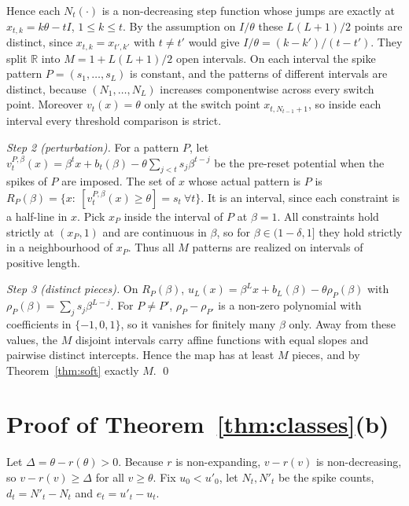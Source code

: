 \documentclass[10pt]{article}
\theoremstyle{remark}
\begin{document}
Hence each $N_t(\cdot)$ is a non-decreasing step function whose jumps are exactly at $x_{t,k}=k\theta-tI$, $1\le k\le t$. By the assumption on $I/\theta$ these $L(L+1)/2$ points are distinct, since $x_{t,k}=x_{t',k'}$ with $t\ne t'$ would give $I/\theta=(k-k')/(t-t')$. They split $\mathbb R$ into $M=1+L(L+1)/2$ open intervals. On each interval the spike pattern $P=(s_1,\ldots,s_L)$ is constant, and the patterns of different intervals are distinct, because $(N_1,\ldots,N_L)$ increases componentwise across every switch point. Moreover $v_t(x)=\theta$ only at the switch point $x_{t,N_{t-1}+1}$, so inside each interval every threshold comparison is strict.

\emph{Step 2 (perturbation).} For a pattern $P$, let $v^{P,\beta}_t(x)=\beta^tx+b_t(\beta)-\theta\sum_{j<t}s_j\beta^{t-j}$ be the pre-reset potential when the spikes of $P$ are imposed. The set of $x$ whose actual pattern is $P$ is $R_P(\beta)=\{x:\ [v^{P,\beta}_t(x)\ge\theta]=s_t\ \forall t\}$. It is an interval, since each constraint is a half-line in $x$. Pick $x_P$ inside the interval of $P$ at $\beta=1$. All constraints hold strictly at $(x_P,1)$ and are continuous in $\beta$, so for $\beta\in(1-\delta,1]$ they hold strictly in a neighbourhood of $x_P$. Thus all $M$ patterns are realized on intervals of positive length.

\emph{Step 3 (distinct pieces).} On $R_P(\beta)$, $u_L(x)=\beta^Lx+b_L(\beta)-\theta\rho_P(\beta)$ with $\rho_P(\beta)=\sum_js_j\beta^{L-j}$. For $P\ne P'$, $\rho_P-\rho_{P'}$ is a non-zero polynomial with coefficients in $\{-1,0,1\}$, so it vanishes for finitely many $\beta$ only. Away from these values, the $M$ disjoint intervals carry affine functions with equal slopes and pairwise distinct intercepts. Hence the map has at least $M$ pieces, and by Theorem~\ref{thm:soft} exactly $M$. \qed

\section{Proof of Theorem~\ref{thm:classes}(b)}
\label{app:classes}

Let $\Delta=\theta-r(\theta)>0$. Because $r$ is non-expanding, $v-r(v)$ is non-decreasing, so $v-r(v)\ge\Delta$ for all $v\ge\theta$. Fix $u_0<u'_0$, let $N_t,N'_t$ be the spike counts, $d_t=N'_t-N_t$ and $e_t=u'_t-u_t$.
\end{document}
